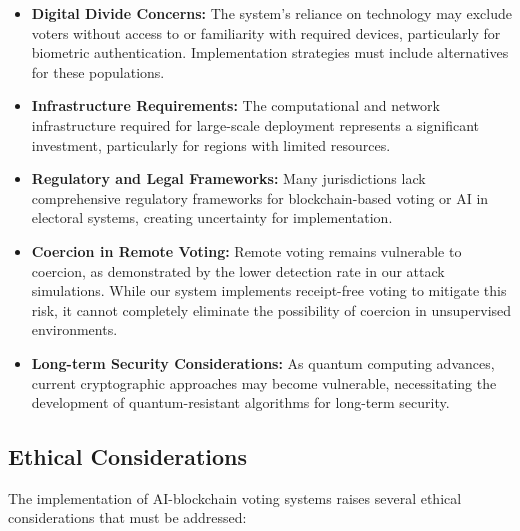 \documentclass[conference]{IEEEtran}
\begin{document}
\begin{itemize}
    \item \textbf{Digital Divide Concerns:} The system's reliance on technology may exclude voters without access to or familiarity with required devices, particularly for biometric authentication. Implementation strategies must include alternatives for these populations.
    
    \item \textbf{Infrastructure Requirements:} The computational and network infrastructure required for large-scale deployment represents a significant investment, particularly for regions with limited resources.
    
    \item \textbf{Regulatory and Legal Frameworks:} Many jurisdictions lack comprehensive regulatory frameworks for blockchain-based voting or AI in electoral systems, creating uncertainty for implementation.
    
    \item \textbf{Coercion in Remote Voting:} Remote voting remains vulnerable to coercion, as demonstrated by the lower detection rate in our attack simulations. While our system implements receipt-free voting to mitigate this risk, it cannot completely eliminate the possibility of coercion in unsupervised environments.
    
    \item \textbf{Long-term Security Considerations:} As quantum computing advances, current cryptographic approaches may become vulnerable, necessitating the development of quantum-resistant algorithms for long-term security.
\end{itemize}

\subsection{Ethical Considerations}
The implementation of AI-blockchain voting systems raises several ethical considerations that must be addressed:
\end{document}
